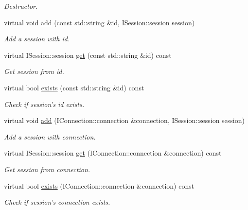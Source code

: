 \begin{DoxyCompactItemize}
\begin{DoxyCompactList}\small\item\em Destructor. \end{DoxyCompactList}\item 
virtual void \hyperlink{class_session_manager_a325642d870111283157cc8721a5b464a}{add} (const std\-::string \&id, I\-Session\-::session session)
\begin{DoxyCompactList}\small\item\em Add a session with id. \end{DoxyCompactList}\item 
virtual I\-Session\-::session \hyperlink{class_session_manager_a09512bc0f68bab62375b4420b4405a97}{get} (const std\-::string \&id) const 
\begin{DoxyCompactList}\small\item\em Get session from id. \end{DoxyCompactList}\item 
virtual bool \hyperlink{class_session_manager_a61701636681ed298d502788def613474}{exists} (const std\-::string \&id) const 
\begin{DoxyCompactList}\small\item\em Check if session's id exists. \end{DoxyCompactList}\item 
virtual void \hyperlink{class_session_manager_aa5abd0c09fd8c9ac77d951a9cc163584}{add} (I\-Connection\-::connection \&connection, I\-Session\-::session session)
\begin{DoxyCompactList}\small\item\em Add a session with connection. \end{DoxyCompactList}\item 
virtual I\-Session\-::session \hyperlink{class_session_manager_a5465b1c549f0dff95ffab4264853b5de}{get} (I\-Connection\-::connection \&connection) const 
\begin{DoxyCompactList}\small\item\em Get session from connection. \end{DoxyCompactList}\item 
virtual bool \hyperlink{class_session_manager_a2290370b1cbe3c78d45e4c0601af59e9}{exists} (I\-Connection\-::connection \&connection) const 
\begin{DoxyCompactList}\small\item\em Check if session's connection exists. \end{DoxyCompactList}\item 

\end{DoxyCompactItemize}
